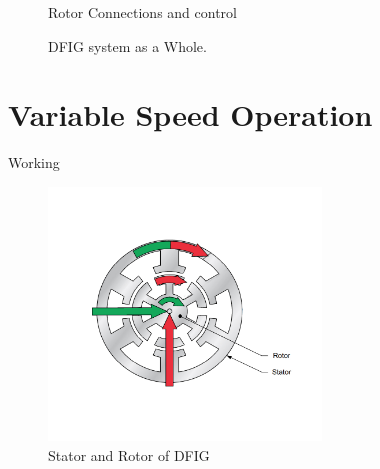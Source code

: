 \documentclass{beamer}
\begin{document}
\begin{frame}{}
       \begin{figure}
        \centering
        \caption{Rotor Connections and control}
    \end{figure}
\end{frame}

\begin{frame}{}
       \begin{figure}
        \centering
        \caption{DFIG system as a Whole.}
    \end{figure}
\end{frame}


\section{Variable Speed Operation}
\begin{frame}{Working}
    \begin{figure}
        \centering
        \includegraphics[width=2.85in]{imgs/dfigOP (1).jpg}
        \caption{Stator and Rotor of DFIG}
    \end{figure}
\end{frame}
\end{document}
